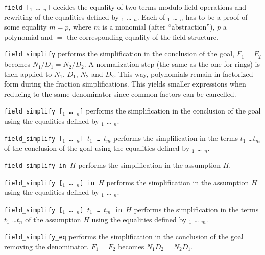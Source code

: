 \begin{Variants}
  \item {\tt field [\term$_1$ {\ldots} \term$_n$]} decides the equality of two
    terms modulo field operations and rewriting of the equalities
    defined by \term$_1$ {\ldots} \term$_n$. Each of \term$_1$
    {\ldots} \term$_n$ has to be a proof of some equality $m = p$,
    where $m$ is a monomial (after ``abstraction''),
    $p$ a polynomial and $=$ the corresponding equality of the field structure.

  \item {\tt field\_simplify} 
     performs the simplification in the conclusion of the goal, $F_1 = F_2$
     becomes $N_1/D_1 = N_2/D_2$. A normalization step (the same as the
     one for rings) is then applied to $N_1$, $D_1$, $N_2$ and
     $D_2$. This way, polynomials remain in factorized form during the
     fraction simplifications. This yields smaller expressions when
     reducing to the same denominator since common factors can be
     cancelled.

  \item {\tt field\_simplify   [\term$_1$ {\ldots} \term$_n$]}
     performs the simplification in the conclusion of the goal using
    the equalities
    defined by \term$_1$ {\ldots} \term$_n$.

  \item {\tt field\_simplify   [\term$_1$ {\ldots} \term$_n$] $t_1$ \ldots
$t_m$}
     performs the simplification in the terms $t_1$ \ldots $t_m$
    of the conclusion of the goal using
    the equalities
    defined by \term$_1$ {\ldots} \term$_n$. 

  \item {\tt field\_simplify in $H$}  
     performs the simplification in the assumption $H$.

  \item {\tt field\_simplify   [\term$_1$ {\ldots} \term$_n$] in $H$}
     performs the simplification in the assumption $H$ using
    the equalities
    defined by \term$_1$ {\ldots} \term$_n$. 

  \item {\tt field\_simplify   [\term$_1$ {\ldots} \term$_n$] $t_1$ \ldots
$t_m$ in $H$}
     performs the simplification in the terms $t_1$ \ldots $t_n$
    of the assumption $H$ using
    the equalities
    defined by \term$_1$ {\ldots} \term$_m$. 

  \item {\tt field\_simplify\_eq}
     performs the simplification in the conclusion of the goal removing
     the denominator. $F_1 = F_2$
     becomes $N_1 D_2 = N_2  D_1$.


\end{Variants}
